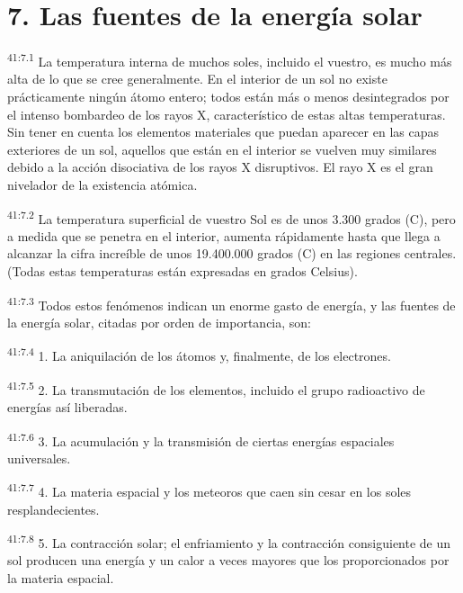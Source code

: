 \section*{7. Las fuentes de la energía solar}
\par
\textsuperscript{41:7.1} La temperatura interna de muchos soles, incluido el vuestro, es mucho más alta de lo que se cree generalmente. En el interior de un sol no existe prácticamente ningún átomo entero; todos están más o menos desintegrados por el intenso bombardeo de los rayos X, característico de estas altas temperaturas. Sin tener en cuenta los elementos materiales que puedan aparecer en las capas exteriores de un sol, aquellos que están en el interior se vuelven muy similares debido a la acción disociativa de los rayos X disruptivos. El rayo X es el gran nivelador de la existencia atómica.

\par
\textsuperscript{41:7.2} La temperatura superficial de vuestro Sol es de unos 3.300 grados (C), pero a medida que se penetra en el interior, aumenta rápidamente hasta que llega a alcanzar la cifra increíble de unos 19.400.000 grados (C) en las regiones centrales. (Todas estas temperaturas están expresadas en grados Celsius).

\par
\textsuperscript{41:7.3} Todos estos fenómenos indican un enorme gasto de energía, y las fuentes de la energía solar, citadas por orden de importancia, son:

\par
\textsuperscript{41:7.4} 1. La aniquilación de los átomos y, finalmente, de los electrones.

\par
\textsuperscript{41:7.5} 2. La transmutación de los elementos, incluido el grupo radioactivo de energías así liberadas.

\par
\textsuperscript{41:7.6} 3. La acumulación y la transmisión de ciertas energías espaciales universales.

\par
\textsuperscript{41:7.7} 4. La materia espacial y los meteoros que caen sin cesar en los soles resplandecientes.

\par
\textsuperscript{41:7.8} 5. La contracción solar; el enfriamiento y la contracción consiguiente de un sol producen una energía y un calor a veces mayores que los proporcionados por la materia espacial.

